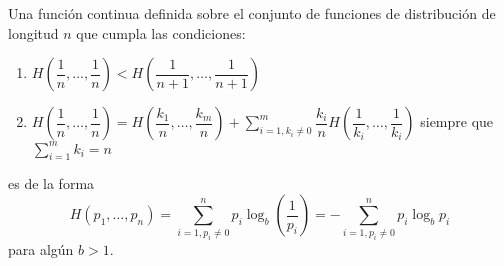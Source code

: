 \begin{teo}
    Una función continua definida sobre el conjunto de funciones de distribución de longitud $n$ que cumpla las condiciones:

    \begin{enumerate}[label=(\arabic*)]
        \item\label{item:l1-i1} $H\left(\dfrac{1}{n},\dots,\dfrac{1}{n}\right) < H\left(\dfrac{1}{n+1},\dots,\dfrac{1}{n+1}\right)$
        \item\label{item:l1-i2} $\displaystyle H\left(\dfrac{1}{n},\dots,\dfrac{1}{n}\right) = H\left(\dfrac{k_1}{n},\dots,\dfrac{k_m}{n}\right)+\sum_{i=1, k_i\neq 0}^m\dfrac{k_i}{n}H\left(\dfrac{1}{k_i},\dots,\dfrac{1}{k_i}\right)$ siempre que $\displaystyle \sum_{i=1}^mk_i=n$
    \end{enumerate}
    es de la forma
    $$H(p_1,\dots,p_n)=\sum_{i=1, p_i\ne 0}^np_i\log_b\left(\dfrac{1}{p_i}\right)=-\sum_{i=1, p_i\ne 0}^np_i\log_bp_i$$
    para algún $b>1$. 
\end{teo}

